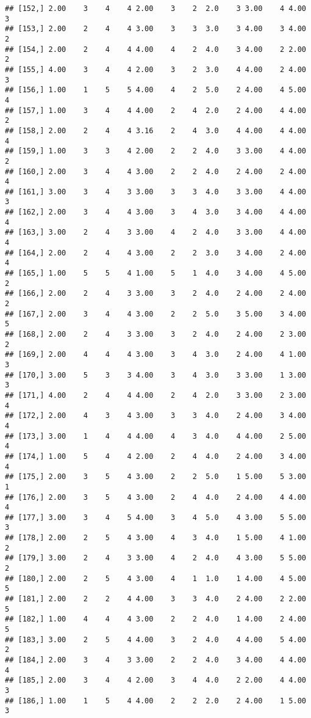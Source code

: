 \documentclass[]{article}
\begin{document}
\begin{verbatim}
## [152,] 2.00    3    4    4 2.00    3    2  2.0    3 3.00    4 4.00    3
## [153,] 2.00    2    4    4 3.00    3    3  3.0    3 4.00    3 4.00    2
## [154,] 2.00    2    4    4 4.00    4    2  4.0    3 4.00    2 2.00    2
## [155,] 4.00    3    4    4 2.00    3    2  3.0    4 4.00    2 4.00    3
## [156,] 1.00    1    5    5 4.00    4    2  5.0    2 4.00    4 5.00    4
## [157,] 1.00    3    4    4 4.00    2    4  2.0    2 4.00    4 4.00    2
## [158,] 2.00    2    4    4 3.16    2    4  3.0    4 4.00    4 4.00    4
## [159,] 1.00    3    3    4 2.00    2    2  4.0    3 3.00    4 4.00    2
## [160,] 2.00    3    4    4 3.00    2    2  4.0    2 4.00    2 4.00    4
## [161,] 3.00    3    4    3 3.00    3    3  4.0    3 3.00    4 4.00    3
## [162,] 2.00    3    4    4 3.00    3    4  3.0    3 4.00    4 4.00    4
## [163,] 3.00    2    4    3 3.00    4    2  4.0    3 3.00    4 4.00    4
## [164,] 2.00    2    4    4 3.00    2    2  3.0    3 4.00    2 4.00    4
## [165,] 1.00    5    5    4 1.00    5    1  4.0    3 4.00    4 5.00    2
## [166,] 2.00    2    4    3 3.00    3    2  4.0    2 4.00    2 4.00    2
## [167,] 2.00    3    4    4 3.00    2    2  5.0    3 5.00    3 4.00    5
## [168,] 2.00    2    4    3 3.00    3    2  4.0    2 4.00    2 3.00    2
## [169,] 2.00    4    4    4 3.00    3    4  3.0    2 4.00    4 1.00    3
## [170,] 3.00    5    3    3 4.00    3    4  3.0    3 3.00    1 3.00    3
## [171,] 4.00    2    4    4 4.00    2    4  2.0    3 3.00    2 3.00    4
## [172,] 2.00    4    3    4 3.00    3    3  4.0    2 4.00    3 4.00    4
## [173,] 3.00    1    4    4 4.00    4    3  4.0    4 4.00    2 5.00    4
## [174,] 1.00    5    4    4 2.00    2    4  4.0    2 4.00    3 4.00    4
## [175,] 2.00    3    5    4 3.00    2    2  5.0    1 5.00    5 3.00    1
## [176,] 2.00    3    5    4 3.00    2    4  4.0    2 4.00    4 4.00    4
## [177,] 3.00    3    4    5 4.00    3    4  5.0    4 3.00    5 5.00    3
## [178,] 2.00    2    5    4 3.00    4    3  4.0    1 5.00    4 1.00    2
## [179,] 3.00    2    4    3 3.00    4    2  4.0    4 3.00    5 5.00    2
## [180,] 2.00    2    5    4 3.00    4    1  1.0    1 4.00    4 5.00    5
## [181,] 2.00    2    2    4 4.00    3    3  4.0    2 4.00    2 2.00    5
## [182,] 1.00    4    4    4 3.00    2    2  4.0    1 4.00    2 4.00    5
## [183,] 3.00    2    5    4 4.00    3    2  4.0    4 4.00    5 4.00    2
## [184,] 2.00    3    4    3 3.00    2    2  4.0    3 4.00    4 4.00    4
## [185,] 2.00    3    4    4 2.00    3    4  4.0    2 2.00    4 4.00    3
## [186,] 1.00    1    5    4 4.00    2    2  2.0    2 4.00    1 5.00    3

\end{verbatim}
\end{document}

